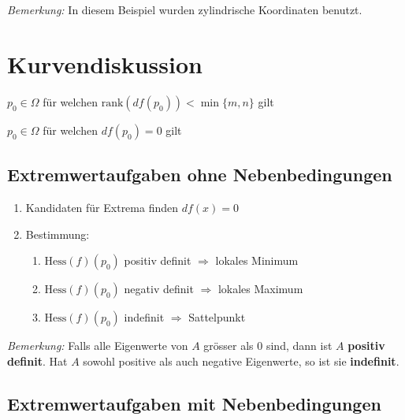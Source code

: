 \documentclass[11pt]{article}
\begin{document}
\emph{Bemerkung:} In diesem Beispiel wurden zylindrische Koordinaten benutzt.

\section{Kurvendiskussion}

\begin{description}[labelindent=16pt,style=multiline,leftmargin=6cm, noitemsep]
	\item[kritischer Punkt:] $p_0 \in \Omega$ f{\"u}r welchen $\text{rank}(df(p_0)) < \min\{m,n\}$ gilt
	\item[Kandidaten für Extrema:] $p_0 \in \Omega$ für welchen $df(p_0) = 0$ gilt
\end{description}

\subsection{Extremwertaufgaben ohne Nebenbedingungen}

\begin{enumerate}[noitemsep]
	\item Kandidaten für Extrema finden $df(x)=0$
	\item Bestimmung:
	\begin{enumerate}[noitemsep]
		\item $\text{Hess}(f)(p_0)$ positiv definit $\Rightarrow$ lokales Minimum
		\item $\text{Hess}(f)(p_0)$ negativ definit $\Rightarrow$ lokales Maximum
		\item $\text{Hess}(f)(p_0)$ indefinit $\Rightarrow$ Sattelpunkt
	\end{enumerate}
\end{enumerate}

\emph{Bemerkung:} Falls alle Eigenwerte von $A$ grösser als $0$ sind, dann ist $A$ \textbf{positiv definit}. Hat $A$ sowohl positive als auch negative Eigenwerte, so ist sie \textbf{indefinit}.

\subsection{Extremwertaufgaben mit Nebenbedingungen}
\end{document}
